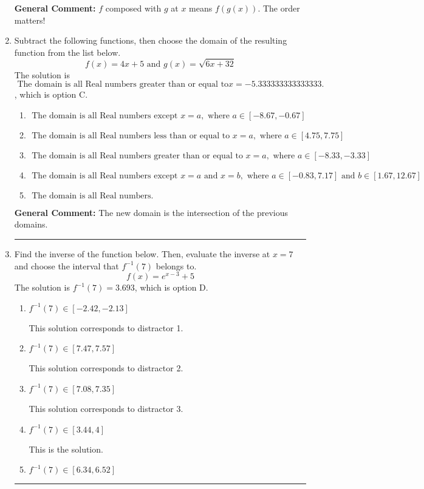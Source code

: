 \documentclass{extbook}[14pt]
\newcommand{\litem}[1]{\item #1

\rule{\textwidth}{0.4pt}}
\begin{document}
\begin{enumerate}
{\begin{enumerate}[label=\Alph*.]
\end{enumerate}

\textbf{General Comment:} $f$ composed with $g$ at $x$ means $f(g(x))$. The order matters!
}
\litem{
Subtract the following functions, then choose the domain of the resulting function from the list below.
\[ f(x) = 4x + 5 \text{ and } g(x) = \sqrt{6x+32}  \]The solution is \( \text{ The domain is all Real numbers greater than or equal to} x = -5.333333333333333. \), which is option C.\begin{enumerate}[label=\Alph*.]
\item \( \text{ The domain is all Real numbers except } x = a, \text{ where } a \in [-8.67, -0.67] \)


\item \( \text{ The domain is all Real numbers less than or equal to } x = a, \text{ where } a \in [4.75, 7.75] \)


\item \( \text{ The domain is all Real numbers greater than or equal to } x = a, \text{ where } a \in [-8.33, -3.33] \)


\item \( \text{ The domain is all Real numbers except } x = a \text{ and } x = b, \text{ where } a \in [-0.83, 7.17] \text{ and } b \in [1.67, 12.67] \)


\item \( \text{ The domain is all Real numbers. } \)


\end{enumerate}

\textbf{General Comment:} The new domain is the intersection of the previous domains.
}
\litem{
Find the inverse of the function below. Then, evaluate the inverse at $x = 7$ and choose the interval that $f^{-1}(7)$ belongs to.
\[ f(x) = e^{x-3}+5 \]The solution is \( f^{-1}(7) = 3.693 \), which is option D.\begin{enumerate}[label=\Alph*.]
\item \( f^{-1}(7) \in [-2.42, -2.13] \)

 This solution corresponds to distractor 1.
\item \( f^{-1}(7) \in [7.47, 7.57] \)

 This solution corresponds to distractor 2.
\item \( f^{-1}(7) \in [7.08, 7.35] \)

 This solution corresponds to distractor 3.
\item \( f^{-1}(7) \in [3.44, 4] \)

 This is the solution.
\item \( f^{-1}(7) \in [6.34, 6.52] \)


\end{enumerate}}
\end{enumerate}
\end{document}
